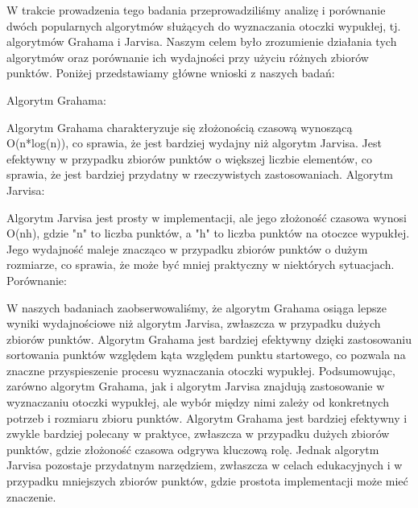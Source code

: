 W trakcie prowadzenia tego badania przeprowadziliśmy analizę i porównanie dwóch popularnych algorytmów służących do wyznaczania otoczki wypukłej, tj. algorytmów Grahama i Jarvisa. Naszym celem było zrozumienie działania tych algorytmów oraz porównanie ich wydajności przy użyciu różnych zbiorów punktów. Poniżej przedstawiamy główne wnioski z naszych badań:

Algorytm Grahama:

Algorytm Grahama charakteryzuje się złożonością czasową wynoszącą O(n*log(n)), co sprawia, że jest bardziej wydajny niż algorytm Jarvisa.
Jest efektywny w przypadku zbiorów punktów o większej liczbie elementów, co sprawia, że jest bardziej przydatny w rzeczywistych zastosowaniach.
Algorytm Jarvisa:

Algorytm Jarvisa jest prosty w implementacji, ale jego złożoność czasowa wynosi O(nh), gdzie "n" to liczba punktów, a "h" to liczba punktów na otoczce wypukłej.
Jego wydajność maleje znacząco w przypadku zbiorów punktów o dużym rozmiarze, co sprawia, że może być mniej praktyczny w niektórych sytuacjach.
Porównanie:

W naszych badaniach zaobserwowaliśmy, że algorytm Grahama osiąga lepsze wyniki wydajnościowe niż algorytm Jarvisa, zwłaszcza w przypadku dużych zbiorów punktów.
Algorytm Grahama jest bardziej efektywny dzięki zastosowaniu sortowania punktów względem kąta względem punktu startowego, co pozwala na znaczne przyspieszenie procesu wyznaczania otoczki wypukłej.
Podsumowując, zarówno algorytm Grahama, jak i algorytm Jarvisa znajdują zastosowanie w wyznaczaniu otoczki wypukłej, ale wybór między nimi zależy od konkretnych potrzeb i rozmiaru zbioru punktów. Algorytm Grahama jest bardziej efektywny i zwykle bardziej polecany w praktyce, zwłaszcza w przypadku dużych zbiorów punktów, gdzie złożoność czasowa odgrywa kluczową rolę. Jednak algorytm Jarvisa pozostaje przydatnym narzędziem, zwłaszcza w celach edukacyjnych i w przypadku mniejszych zbiorów punktów, gdzie prostota implementacji może mieć znaczenie.




